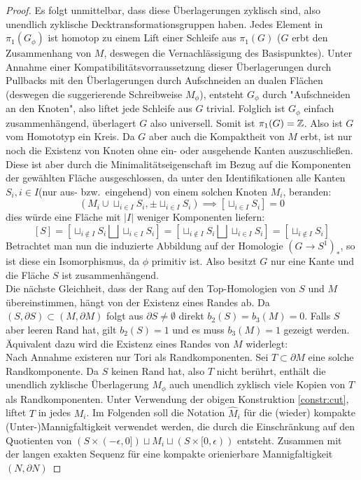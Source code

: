 \begin{proof}
	 Es folgt unmittelbar, dass diese Überlagerungen zyklisch sind, also unendlich zyklische Decktransformationsgruppen haben. Jedes Element in $\pi_1(G_\phi)$ ist homotop zu einem Lift einer Schleife  aus $\pi_1(G)$ ($G$ erbt den Zusammenhang von $M$, deswegen die Vernachlässigung des Basispunktes). Unter Annahme einer Kompatibilitätsvorraussetzung dieser Überlagerungen durch Pullbacks mit den Überlagerungen durch Aufschneiden an dualen Flächen (deswegen die suggerierende Schreibweise $M_\phi$), entsteht $G_\phi$ durch "Aufschneiden an den Knoten", also liftet jede Schleife aus $G$ trivial. Folglich ist $G_\phi$ einfach zusammenhängend, überlagert $G$ also universell. Somit ist $\pi_1(G)= \mathbb{Z}$. Also ist $G$ vom Homototyp ein Kreis. Da $G$ aber auch die Kompaktheit von $M$ erbt, ist nur noch die Existenz von Knoten ohne ein- oder ausgehende Kanten auszuschließen. Diese ist aber durch die Minimalitätseigenschaft im Bezug auf die Komponenten der gewählten Fläche ausgeschlossen, da unter den Identifikationen alle Kanten $S_i, i\in I$(nur aus- bzw.~eingehend) von einem solchen Knoten $M_i$, beranden:
	 \[
	 	(M_i\cup \sqcup_{i\in I} S_i, \pm \sqcup_{i\in I} S_i) \implies [\sqcup_{i\in I}S_i]=0
	 \]
	 dies würde eine Fläche mit $|I|$ weniger Komponenten liefern:
	 \[
	 	[S]=[\sqcup_{i\not \in I} S_i\bigsqcup \sqcup_{i\in I} S_i] = [\sqcup_{i\not \in I} S_i \bigsqcup \sqcup_{i\in I} S_i] = [\sqcup_{i\not \in I}S_i]
	 \]
	 Betrachtet man nun die induzierte Abbildung auf der Homologie $(G\to S^1)_*$, so ist diese ein Isomorphismus, da $\phi$ primitiv ist. Also besitzt $G$ nur eine Kante und die Fläche $S$ ist zusammenhängend.\\
	 Die nächste Gleichheit, dass der Rang auf den Top-Homologien von $S$ und $M$ übereinstimmen, hängt von der Existenz eines Randes ab. Da $(S,\partial S) \subset (M,\partial M)$ folgt aus $\partial S \neq \emptyset$ direkt $b_2(S)=b_3(M)=0$. Falls $S$ aber leeren Rand hat, gilt $b_2(S)=1$ und es muss $b_3(M)=1$ gezeigt werden. Äquivalent dazu wird die Existenz eines Randes von $M$ widerlegt:\\
	 Nach Annahme existeren nur Tori als Randkomponenten. Sei $T \subset \partial M$ eine solche Randkomponente. Da $S$ keinen Rand hat, also $T$ nicht berührt, enthält die unendlich zyklische Überlagerung $M_\phi$ auch unendlich zyklisch viele Kopien von $T$ als Randkomponenten. Unter Verwendung der obigen Konstruktion \ref{constr:cut}, liftet $T$ in jedes $M_i$. Im Folgenden soll die Notation $\hat M_i$ für die (wieder) kompakte (Unter-)Mannigfaltigkeit verwendet werden, die durch die Einschränkung auf den Quotienten von $(S\times (-\epsilon,0]) \sqcup M_i \sqcup (S\times[0,\epsilon))$   entsteht. Zusammen mit der langen exakten Sequenz für eine kompakte orienierbare Mannigfaltigkeit $(N,\partial N)$

\end{proof}

